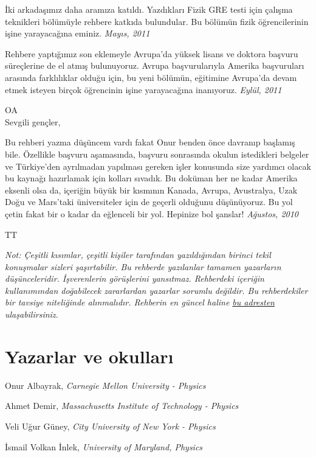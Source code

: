 \documentclass[12pt]{article}
\begin{document}
İki arkadaşımız daha aramıza katıldı. Yazdıkları Fizik GRE testi için çalışma teknikleri bölümüyle rehbere katkıda bulundular. Bu bölümün fizik öğrencilerinin işine yarayacağına eminiz. \textit{Mayıs, 2011}

Rehbere yaptığımız son eklemeyle Avrupa'da yüksek lisans ve doktora başvuru süreçlerine de el atmış bulunuyoruz. Avrupa başvurularıyla Amerika başvuruları arasında farklılıklar olduğu için, bu yeni bölümün, eğitimine Avrupa'da devam etmek isteyen birçok öğrencinin işine yarayacağına inanıyoruz. \textit{Eylül, 2011}


\noindent OA \\


\noindent Sevgili gençler, 

Bu rehberi yazma düşüncem vardı fakat Onur benden önce davranıp başlamış bile. Özellikle başvuru aşamasında, başvuru sonrasında okulun istedikleri belgeler ve Türkiye’den ayrılmadan yapılması gereken işler konusunda size yardımcı olacak bu kaynağı hazırlamak için kolları sıvadık. Bu doküman her ne kadar Amerika eksenli olsa da, içeriğin büyük bir kısmının Kanada, Avrupa, Avustralya, Uzak Doğu ve Mars’taki üniversiteler için de geçerli olduğunu düşünüyoruz. Bu yol çetin fakat bir o kadar da eğlenceli bir yol. Hepinize bol şanslar! \textit{Ağustos, 2010}

\noindent TT  

\textit{Not: Çeşitli kısımlar, çeşitli kişiler tarafından yazıldığından birinci tekil konuşmalar sizleri şaşırtabilir. Bu rehberde yazılanlar tamamen yazarların düşünceleridir. İşverenlerin görüşlerini yansıtmaz. Rehberdeki içeriğin kullanımından doğabilecek zararlardan yazarlar sorumlu değildir. Bu rehberdekiler bir tavsiye niteliğinde alınmalıdır.
Rehberin en güncel haline \href{https://github.com/yurtdisiphdrehberi/yurtdisiphdrehberi/}{bu adresten} ulaşabilirsiniz.}

\newpage
%
%
%
\section*{Yazarlar ve okulları}

Onur Albayrak, \textit{Carnegie Mellon University - Physics }

Ahmet Demir, \textit{Massachusetts Institute of Technology - Physics}

Veli Uğur Güney, \textit{City University of New York - Physics }

İsmail Volkan İnlek, \textit{University of Maryland, Physics}
\end{document}
